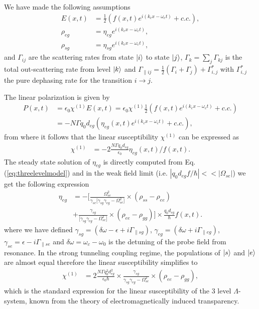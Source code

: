 \documentclass[]{spie}  %
\begin{document}
 We have made the following assumptions
 \begin{align}
 E(x,t) &= \frac{1}{2} (f(x,t) e^{i(k_cx-\omega_c t)}+c.c.),\\
 \rho_{eg} &= \eta_{eg}e^{i(k_cx-\omega_c t)}, \\
 \rho_{sg} &= \eta_{sg}e^{i(k_cx-\omega_c t)}, 
 \end{align}
 and $\Gamma_{ij} $ are the scattering rates from state $\ket{i}$ to state $\ket{j}$, $\Gamma_k = \sum_{j}\Gamma_{kj}$ is the total out-scattering rate from level $\ket{k}$ and $\Gamma_{\parallel ij} = \frac{1}{2}(\Gamma_{i} + \Gamma_j) + \Gamma_{i,j}^*$ with $\Gamma_{i,j}^*$ the pure dephasing rate for the transition $i\rightarrow j$. 
 
 The linear polarization is given by
 \begin{align}
 P(x,t) &=\epsilon_0 \chi^{(1)} E(x,t) = \epsilon_0 \chi^{(1)} \frac{1}{2}( f(x,t) e^{i(k_cx-\omega_c t)}+c.c.) \nonumber \\  
 &= -N\Gamma q_0d_{eg}(\eta_{eg}(x,t)e^{i(k_cx-\omega_c t)} + c.c.),
 \end{align}
 from where it follows that the linear susceptibility $\chi^{(1)}$ can be expressed as
 \begin{align}
 \chi^{(1)} &= -2\frac{N\Gamma q_0d_{eg}}{\epsilon_0 } \eta_{eg}(x,t)/f(x,t).
 \end{align}
 The steady state solution of $\eta_{eg}$ is directly computed from Eq. (\ref{eq:threelevelmodel}) and in the weak field limit (i.e. $|q_0d_{eg}f/\hbar| << |\Omega_{se}|$) we get the following expression
 \begin{align}
 \eta_{eg}  &= -[ \frac{\Omega_{se}^2}{ \gamma_{se} \big[\gamma_{sg}\gamma_{eg} -\Omega_{se}^2\big ] }\times (\rho_{ss}-\rho_{ee})  \nonumber \\
 &+ \frac{\gamma_{sg}}{\big[\gamma_{sg}\gamma_{eg} -\Omega_{se}^2\big ] }\times (\rho_{ee}-\rho_{gg}) ]\times \frac{q_0d_{eg}}{\hbar}f(x,t). 
 \end{align}
 where we have defined $\gamma_{sg} =(\delta\omega - \epsilon + i\Gamma_{\parallel sg}) $, $\gamma_{eg} =(\delta\omega + i\Gamma_{\parallel eg})$, $\gamma_{se} = \epsilon - i\Gamma_{\parallel se}$ and $\delta\omega = \omega_c-\omega_0$ is the detuning of the probe field from resonance. In the strong tunneling coupling regime, the populations of $\ket{s}$ and $\ket{e}$ are almost equal therefore the linear susceptibility simplifies to
 \begin{align}
 \chi^{(1)} &= 2\frac{N\Gamma q_0^2d_{eg}^2}{\epsilon_0 \hbar}  \times \frac{\gamma_{sg}}{\gamma_{sg}\gamma_{eg} -\Omega_{se}^2  }\times (\rho_{ee}-\rho_{gg}),
 \end{align}
 which is the standard expression for the linear susceptibility of the 3 level $\Lambda$-system, known from the theory of electromagnetically induced transparency. 
 
\end{document}
